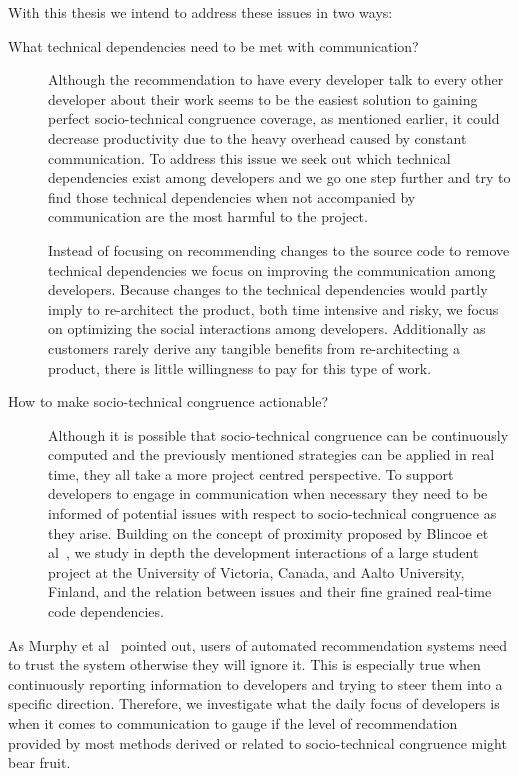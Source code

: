 With this thesis we intend to address these issues in two ways:
\begin{description}
\item[What technical dependencies need to be met with communication?] 
Although the recommendation to have every developer talk to every other developer about their work seems to be the easiest solution to gaining perfect socio-technical congruence coverage, as mentioned earlier, it could decrease productivity due to the heavy overhead caused by  constant communication.
To address this issue we seek out which technical dependencies exist among developers and we go one step further and try to find those technical dependencies when not accompanied by communication are the most harmful to the project.

Instead of focusing on recommending changes to the source code to remove technical dependencies we focus on improving the communication among developers.
Because changes to the technical dependencies would partly imply to re-architect the product, both time intensive and risky, we focus on optimizing the social interactions among developers.
Additionally as customers rarely derive any tangible benefits from re-architecting a product, there is little willingness to pay for this type of work.

\item[How to make socio-technical congruence actionable?] Although it is possible that socio-technical congruence can be continuously computed and the previously mentioned strategies can be applied in real time, they all take a more project centred perspective.
To support developers to engage in communication when necessary they need to be informed of potential issues with respect to socio-technical congruence as they arise.
Building on the concept of proximity proposed by Blincoe et al~\cite{blincoe:cscw:2012}, we study in depth the development interactions of a large student project at the University of Victoria, Canada, and Aalto University, Finland, and the relation between issues and their fine grained real-time code dependencies.
\end{description}

As Murphy et al~\cite{murphy:rsse:2010} pointed out, users of automated recommendation systems need to trust the system otherwise they will ignore it.
This is especially true when continuously reporting information to developers and trying to steer them into a specific direction.
Therefore, we investigate what the daily focus of developers is when it comes to communication to gauge if the level of recommendation provided by most methods derived or related to socio-technical congruence might bear fruit.

